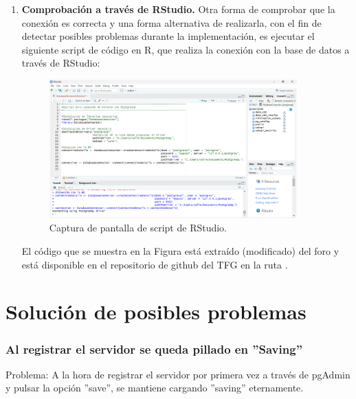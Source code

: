\begin{enumerate}[label=\alph*]
    \item \textbf{Comprobación a través de RStudio.} Otra forma de comprobar que la conexión es correcta y una forma alternativa de realizarla, con el fin de detectar posibles problemas durante la implementación, es ejecutar el siguiente script de código en R, que realiza la conexión con la base de datos a través de RStudio:
    
    \begin{figure}[H]
    \centering
    \includegraphics[width=0.90\textwidth]{figures/RStudio.png}
     \caption{Captura de pantalla de script de RStudio.}
    \label{fig:RStudio}
    \end{figure}

    El código que se muestra en la Figura está extraído (modificado) del foro \cite{forumBroadseaDB} y está disponible en el repositorio de github del TFG en la ruta  \cite{vallealonsodc}.
    
\end{enumerate}

\section{Solución de posibles problemas} \label{sec:03problemas}

\subsubsection{Al registrar el servidor se queda pillado en ''Saving''}
Problema: A la hora de registrar el servidor por primera vez a través de pgAdmin y pulsar la opción ''save'', se mantiene cargando ''saving'' eternamente.

